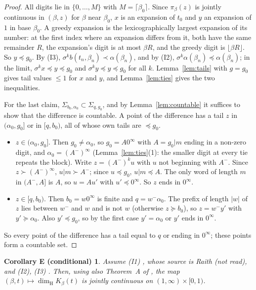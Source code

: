 \documentclass[11pt]{amsart}
\newtheorem*{corE}{Corollary E (conditional)}
\theoremstyle{definition}
\theoremstyle{remark}
\newcommand{\dimH}{\dim_{\mathrm H}}
\newcommand{\lex}{\preccurlyeq}
\newcommand{\gex}{\succcurlyeq}
\begin{document}
\begin{proof}
All digits lie in $\{0,\dots,M\}$ with $M=\lceil\beta_0\rceil$. Since $\pi_\beta(z)$ is jointly continuous in $(\beta,z)$ for $\beta$ near $\beta_0$, $x$ is an expansion of $t_0$ and $y$ an expansion of $1$ in base $\beta_0$. A greedy expansion is the lexicographically largest expansion of its number: at the first index where an expansion differs from it, both have the same remainder $R$, the expansion's digit is at most $\beta R$, and the greedy digit is $\lfloor\beta R\rfloor$. So $y\lex g_0$. By (I3), $\sigma^kb(t_n,\beta_n)\prec\alpha(\beta_n)$, and by (I2), $\sigma^k\alpha(\beta_n)\lex\alpha(\beta_n)$; in the limit, $\sigma^kx\lex y\lex g_0$ and $\sigma^ky\lex y\lex g_0$ for all $k$. Lemma~\ref{lem:tails} with $g=g_0$ gives tail values $\le1$ for $x$ and $y$, and Lemma~\ref{lem:ties} gives the two inequalities.

For the last claim, $\Sigma_{b_0,\alpha_0}\subset\Sigma_{q,g_0}$, and by Lemma~\ref{lem:countable} it suffices to show that the difference is countable. A point of the difference has a tail $z$ in $(\alpha_0,g_0]$ or in $[q,b_0)$, all of whose own tails are $\lex g_0$.
\begin{itemize}
\item $z\in(\alpha_0,g_0]$. Then $g_0\ne\alpha_0$, so $g_0=A0^\infty$ with $A=g_0|m$ ending in a non-zero digit, and $\alpha_0=(A^-)^\infty$ (Lemma~\ref{lem:ties}(1): the smaller digit at every tie repeats the block). Write $z=(A^-)^ku$ with $u$ not beginning with $A^-$. Since $z\succ(A^-)^\infty$, $u|m\succ A^-$; since $u\lex g_0$, $u|m\lex A$. The only word of length $m$ in $(A^-,A]$ is $A$, so $u=Au'$ with $u'\lex0^\infty$. So $z$ ends in $0^\infty$.
\item $z\in[q,b_0)$. Then $b_0=w0^\infty$ is finite and $q=w^-\alpha_0$. The prefix of length $|w|$ of $z$ lies between $w^-$ and $w$ and is not $w$ (otherwise $z\gex b_0$), so $z=w^-y'$ with $y'\gex\alpha_0$. Also $y'\lex g_0$, so by the first case $y'=\alpha_0$ or $y'$ ends in $0^\infty$.
\end{itemize}
So every point of the difference has a tail equal to $q$ or ending in $0^\infty$; these points form a countable set.
\end{proof}

\begin{corE}
Assume \textup{(I1)} \cite[Lemma~6.2]{AKgen}, whose source is Raith \cite{Raith94} (not read), and \textup{(I2)}, \textup{(I3)} \cite[Lemmas~4.1 and~4.2]{AKgen}. Then, using also Theorem~A of \cite{Nem26}, the map $(\beta,t)\mapsto\dimH K_\beta(t)$ is jointly continuous on $(1,\infty)\times[0,1)$.
\end{corE}
\end{document}

